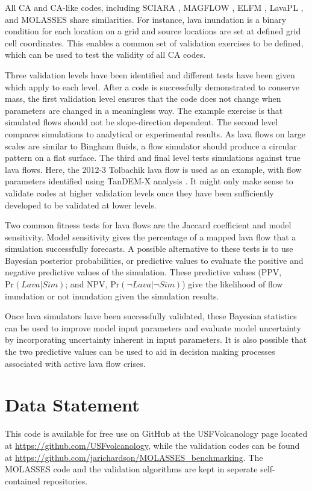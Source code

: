 	All CA and CA-like codes, including SCIARA \citep{crisci2004simulation}, MAGFLOW \citep{del2008simulations}, ELFM \citep{damiani2006lava}, LavaPL \citep{connor2012probabilistic}, and MOLASSES share similarities. For instance, lava inundation is a binary condition for each location on a grid and source locations are set at defined grid cell coordinates. This enables a common set of validation exercises to be defined, which can be used to test the validity of all CA codes.
	
	Three validation levels have been identified and different tests have been given which apply to each level. After a code is successfully demonstrated to conserve mass, the first validation level ensures that the code does not change when parameters are changed in a meaningless way. The example exercise is that simulated flows should not be slope-direction dependent. The second level compares simulations to analytical or experimental results. As lava flows on large scales are similar to Bingham fluids, a flow simulator should produce a circular pattern on a flat surface. The third and final level tests simulations against true lava flows. Here, the 2012-3 Tolbachik lava flow is used as an example, with flow parameters identified using TanDEM-X analysis \citep{kubanek2015lava}. It might only make sense to validate codes at higher validation levels once they have been sufficiently developed to be validated at lower levels.
	
	Two common fitness tests for lava flows are the Jaccard coefficient and model sensitivity. Model sensitivity gives the percentage of a mapped lava flow that a simulation successfully forecasts. A possible alternative to these tests is to use Bayesian posterior probabilities, or predictive values to evaluate the positive and negative predictive values of the simulation. These predictive values (PPV, $\text{Pr}(Lava|Sim)$; and NPV, $\text{Pr}(\neg Lava|\neg Sim)$) give the likelihood of flow inundation or not inundation given the simulation results.
	
	Once lava simulators have been successfully validated, these Bayesian statistics can be used to improve model input parameters and evaluate model uncertainty by incorporating uncertainty inherent in input parameters. It is also possible that the two predictive values can be used to aid in decision making processes associated with active lava flow crises.
	
	
\section{Data Statement}
This code is available for free use on GitHub at the USFVolcanology page located at \url{https://github.com/USFvolcanology}, while the validation codes can be found at \url{https://github.com/jarichardson/MOLASSES_benchmarking}. The MOLASSES code and the validation algorithms are kept in seperate self-contained repositories.

